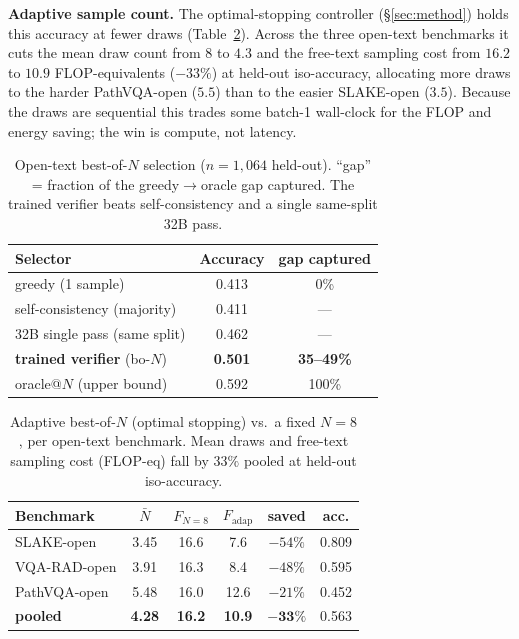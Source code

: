 \documentclass[conference]{IEEEtran}
\begin{document}
\textbf{Adaptive sample count.} The optimal-stopping controller (\S\ref{sec:method}) holds this accuracy at fewer draws (Table~\ref{tab:adaptiveN}). Across the three open-text benchmarks it cuts the mean draw count from $8$ to $4.3$ and the free-text sampling cost from $16.2$ to $10.9$ FLOP-equivalents ($-33\%$) at held-out iso-accuracy, allocating more draws to the harder PathVQA-open ($5.5$) than to the easier SLAKE-open ($3.5$). Because the draws are sequential this trades some batch-1 wall-clock for the FLOP and energy saving; the win is compute, not latency.

\begin{table}[t]
\centering
\caption{Open-text best-of-$N$ selection ($n{=}1{,}064$ held-out). ``gap'' = fraction of the greedy$\to$oracle gap captured. The trained verifier beats self-consistency and a single same-split 32B pass.}
\label{tab:verifier}
\footnotesize
\begin{tabular}{@{}lcc@{}}
\toprule
Selector & Accuracy & gap captured \\
\midrule
greedy (1 sample)              & 0.413 & 0\% \\
self-consistency (majority)    & 0.411 & --- \\
32B single pass (same split)   & 0.462 & --- \\
\textbf{trained verifier} (bo-$N$) & \textbf{0.501} & \textbf{35--49\%} \\
\midrule
oracle@$N$ (upper bound)       & 0.592 & 100\% \\
\bottomrule
\end{tabular}
\end{table}

\begin{table}[t]
\centering
\caption{Adaptive best-of-$N$ (optimal stopping) vs.\ a fixed $N{=}8$, per open-text benchmark. Mean draws and free-text sampling cost (FLOP-eq) fall by $33\%$ pooled at held-out iso-accuracy.}
\label{tab:adaptiveN}
\footnotesize
\setlength{\tabcolsep}{3.5pt}
\begin{tabular}{@{}lccccc@{}}
\toprule
Benchmark & $\bar N$ & $F_{N=8}$ & $F_{\text{adap}}$ & saved & acc. \\
\midrule
SLAKE-open   & 3.45 & 16.6 & 7.6 & $-54\%$ & 0.809 \\
VQA-RAD-open & 3.91 & 16.3 & 8.4 & $-48\%$ & 0.595 \\
PathVQA-open & 5.48 & 16.0 & 12.6 & $-21\%$ & 0.452 \\
\midrule
\textbf{pooled} & \textbf{4.28} & \textbf{16.2} & \textbf{10.9} & $\mathbf{-33\%}$ & 0.563 \\
\bottomrule
\end{tabular}
\end{table}
\end{document}
